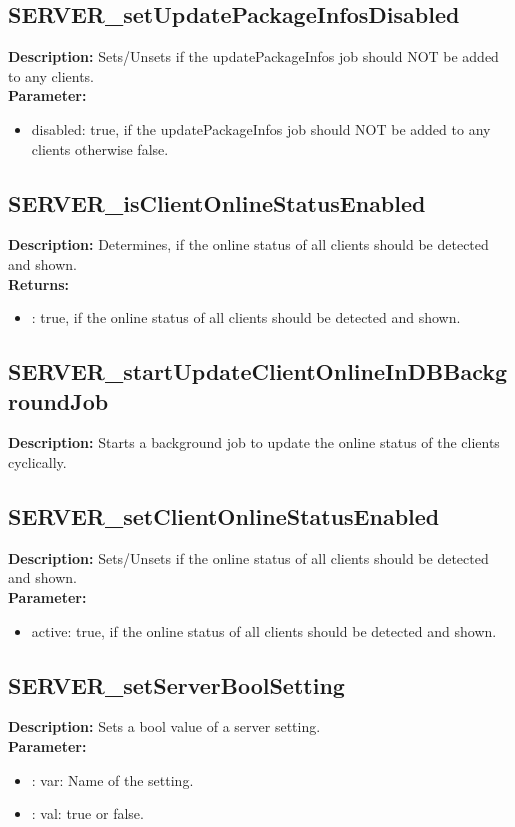 \subsection{SERVER\_setUpdatePackageInfosDisabled}
\textbf{Description:} Sets/Unsets if the updatePackageInfos job should NOT be added to any clients.\\
\textbf{Parameter:}
\begin{itemize}
\item disabled: true, if the updatePackageInfos job should NOT be added to any clients otherwise false.
\end{itemize}

\subsection{SERVER\_isClientOnlineStatusEnabled}
\textbf{Description:} Determines, if the online status of all clients should be detected and shown.\\
\textbf{Returns:}
\begin{itemize}
\item : true, if the online status of all clients should be detected and shown.
\end{itemize}

\subsection{SERVER\_startUpdateClientOnlineInDBBackgroundJob}
\textbf{Description:} Starts a background job to update the online status of the clients cyclically.\\

\subsection{SERVER\_setClientOnlineStatusEnabled}
\textbf{Description:} Sets/Unsets if the online status of all clients should be detected and shown.\\
\textbf{Parameter:}
\begin{itemize}
\item active: true, if the online status of all clients should be detected and shown.
\end{itemize}

\subsection{SERVER\_setServerBoolSetting}
\textbf{Description:} Sets a bool value of a server setting.\\
\textbf{Parameter:}
\begin{itemize}
\item : var: Name of the setting.
\item : val: true or false.
\end{itemize}

